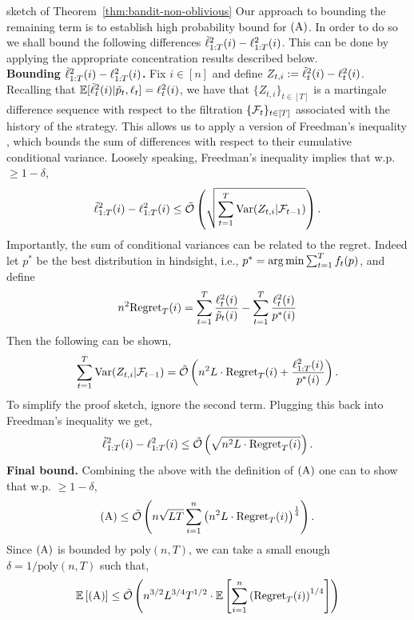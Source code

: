 \begin{proofarg}{sketch of Theorem~\ref{thm:bandit-non-oblivious}}
Our approach  to bounding  the remaining term is to establish  high probability bound for $\rA$. In order to do so we shall bound the following differences $\tilde{\ell}_{1:T}^2(i) - \ell_{1:T}^2(i)$. This can be done by applying the 
\vspace{10pt}
appropriate concentration results described below. \\
\textbf{Bounding  $\tilde{\ell}_{1:T}^2(i) - \ell_{1:T}^2(i)$.}
Fix $i\in[n]$ and define $Z_{t,i}:=\tilde{\ell}_t^2(i) - \ell_t^2(i)$. Recalling that \linebreak $\mathbb{E}[\tilde{\ell}_t^2(i) \vert \tilde{p}_t,\ell_t] = \ell_t^2(i)$, we have that $\{ Z_{t,i}\}_{t\in[T]}$ is a martingale difference sequence with respect to the filtration $\{\mathcal{F}_{t}\}_{t\in[T]}$ associated with the history of the strategy.  This allows us to apply a version of Freedman's inequality \citep{freedman1975tail}, which bounds the 
sum of differences with respect to their cumulative conditional variance.
Loosely speaking, Freedman's inequality implies that w.p. $\geq 1-\delta$,
$$
\tilde{\ell}_{1:T}^2(i) - \ell_{1:T}^2(i) \leq \tilde{\mathcal{O}}\left(  \sqrt{ \sum_{t=1}^T \text{Var}(Z_{t,i} \vert \mathcal{F}_{t-1})} \right).
$$
Importantly, the sum of conditional variances can be related to the regret.
Indeed let $p^*$ be the best distribution in hindsight, i.e., $p^* = \arg\min \sum_{t=1}^T f_t(p)$, and define 
$$
 n^2\text{Regret}_T(i) = \sum_{t=1}^T \frac{\ell_t^2(i)}{\tilde{p}_t(i)} - \sum_{t=1}^T  \frac{\ell_t^2(i)}{p^*(i)}$$
 Then the following can be  shown,
 $$
 \sum_{t=1}^T \text{Var}(Z_{t,i} \vert \mathcal{F}_{t-1}) 
 = \tilde{\mathcal{O}}\left(n^2 L \cdot \text{Regret}_T(i) +    \frac{\ell_{1:T}^2(i)}{p^*(i)} \right).
 $$
To simplify the proof sketch, ignore the second term. Plugging this back into Freedman's inequality  we get,
\begin{equation} \label{eq:BoundReg_i}
\tilde{\ell}_{1:T}^2(i) - \ell_{1:T}^2(i) \leq \tilde{\mathcal{O}}\left(   \sqrt{ n^2 L \cdot  
\text{Regret}_T(i)
} \right).
\end{equation}
\textbf{Final  bound.} Combining the above with the definition of $\rA$
one can to show that w.p. $\geq 1-\delta$,
\begin{equation*}
{\rA} \leq \tO \left(  n\sqrt{LT}\sumin \left( n^2L \cdot \regret_T(i) \right)^\frac{1}{4} \right).
\end{equation*}
Since $\rA$ is bounded by $\text{poly}(n,T)$, we can take 
a small enough $\delta = 1/\text{poly}(n,T)$ such that,
\begin{align*}
\expval{\rA} 
&\leq 
\tO \left(  n^{3/2}L^{3/4}T^{1/2} \cdot
\expval{\sumin 
\left( \regret_T(i) \right)^{1/4} }
 \right)\\

\end{align*}
\end{proofarg}
